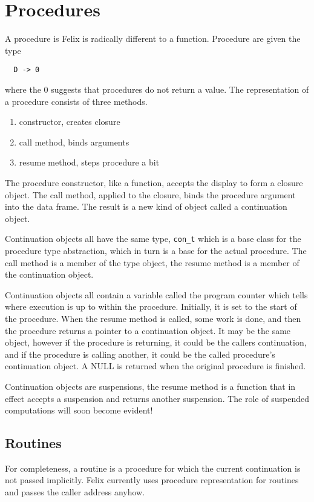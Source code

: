 \documentclass[oneside]{book}
\begin{document}
\section{Procedures}

A procedure is Felix is radically different to a function. Procedure are given the type

\begin{verbatim}
  D -> 0
\end{verbatim}

where the 0 suggests that procedures do not return a value. The representation of a procedure
consists of three methods.

\begin{enumerate}
\item constructor, creates closure
\item call method, binds arguments
\item resume method, steps procedure a bit
\end{enumerate}

The procedure constructor, like a function, accepts the display to form a closure object.
The call method, applied to the closure, binds the procedure argument into the data frame.
The result is a new kind of object called a continuation object.

Continuation objects all have the same type, \verb$con_t$ which is a base class for
the procedure type abstraction, which in turn is a base for the actual procedure.
The call method is a member of the type object, the resume method is a member
of the continuation object.

Continuation objects all contain a variable called the program counter which tells
where execution is up to within the procedure. Initially, it is set to the start
of the procedure. When the resume method is called, some work is done, and then
the procedure returns a pointer to a continuation object. It may be the same
object, however if the procedure is returning, it could be the callers continuation,
and if the procedure is calling another, it could be the called procedure's 
continuation object. A NULL is returned when the original procedure is finished.

Continuation objects are suspensions, the resume method is a function that
in effect accepts a suspension and returns another suspension. The role
of suspended computations will soon become evident!

\subsection{Routines}
For completeness, a routine is a procedure for which the current continuation
is not passed implicitly.  Felix currently uses procedure representation for
routines and passes the caller address anyhow.
\end{document}

